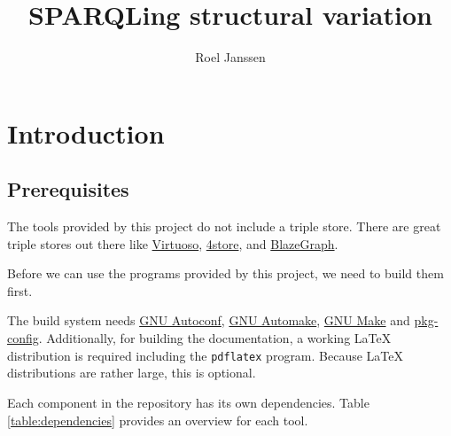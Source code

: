 \documentclass[11pt,a4paper]{book}
\title{SPARQLing structural variation}
\author{Roel Janssen}
\begin{document}
\begin{titlepage}
  \maketitle
  \thispagestyle{empty}
\end{titlepage}


\setcounter{page}{1}
\hypersetup{linkcolor=black}
\tableofcontents
\newpage{}

\setcounter{page}{1}

\chapter{Introduction}


\section{Prerequisites}
\label{sec:prerequisites}

  The tools provided by this project do not include a triple store.  There are
  great triple stores out there like \href{https://virtuoso.openlinksw.com/}
  {Virtuoso}, \href{https://github.com/4store/4store}{4store}, and
  \href{https://www.blazegraph.com/}{BlazeGraph}.

  Before we can use the programs provided by this project, we need to build
  them first.

  The build system needs \href{https://www.gnu.org/software/autoconf}{GNU Autoconf},
  \href{https://www.gnu.org/software/automake}{GNU Automake},
  \href{https://www.gnu.org/software/make}{GNU Make} and
  \href{https://www.freedesktop.org/wiki/Software/pkg-config/}{pkg-config}.
  Additionally, for building the documentation, a working \LaTeX{} distribution is
  required including the \texttt{pdflatex} program.  Because \LaTeX{} distributions
  are rather large, this is optional.

  Each component in the repository has its own dependencies.  Table
  \ref{table:dependencies} provides an overview for each tool.
\end{document}
